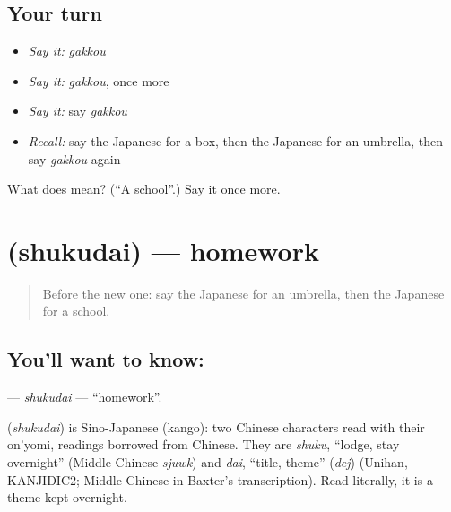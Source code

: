 \subsection*{Your turn}
\begin{itemize}
\raggedright
  \item \emph{Say it:} \emph{gakkou}
  \item \emph{Say it:} \emph{gakkou}, once more
  \item \emph{Say it:} say \emph{gakkou}
  \item \emph{Recall:} say the Japanese for a box, then the Japanese for an umbrella, then say \emph{gakkou} again
\end{itemize}

\begin{tcolorbox}[breakable,colback=teal!4,colframe=teal!35!black,title={Before you move on}]
What does  mean? (\textquotedblleft{}A school\textquotedblright{}.) Say it once more.
\end{tcolorbox}
\section[\texorpdfstring{\ja{しゅくだい} (shukudai)}{しゅくだい (shukudai)}]{ (shukudai) — homework}

\label{lesson:JA-C40-shukudai}



\begin{quote}
Before the new one: say the Japanese for an umbrella, then the Japanese for a school.
\end{quote}

\subsection*{You'll want to know: }
\textbf{} — \emph{shukudai} — \textquotedblleft{}homework\textquotedblright{}.

\begin{cousinweb}
\textbf{} (\emph{shukudai}) is Sino-Japanese (kango): two Chinese characters read with their on'yomi, readings borrowed from Chinese. They are \emph{shuku}, \textquotedblleft{}lodge, stay overnight\textquotedblright{} (Middle Chinese \emph{sjuwk}) and \emph{dai}, \textquotedblleft{}title, theme\textquotedblright{} (\emph{dej}) (Unihan, KANJIDIC2; Middle Chinese in Baxter's transcription). Read literally, it is a theme kept overnight.
\end{cousinweb}

